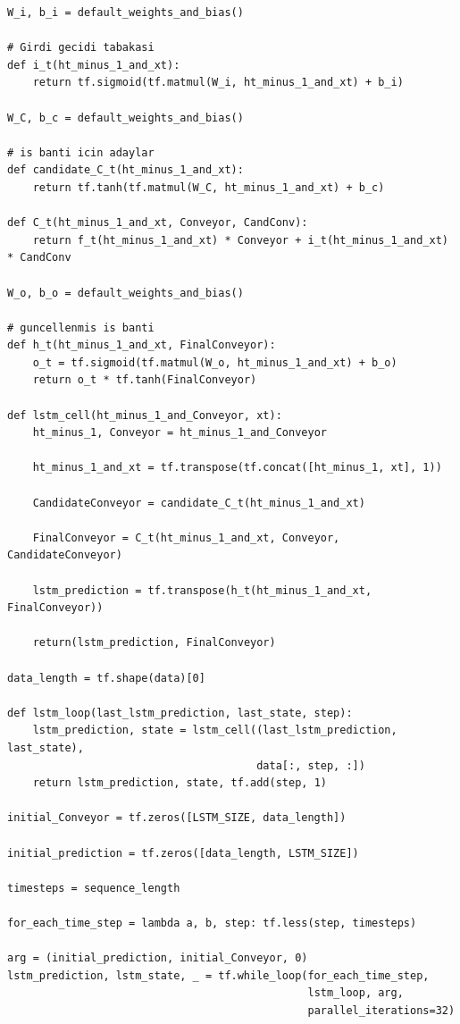 \documentclass[12pt,fleqn]{article}\usepackage{../../common}
\begin{document}
\begin{verbatim}
W_i, b_i = default_weights_and_bias()

# Girdi gecidi tabakasi
def i_t(ht_minus_1_and_xt):
    return tf.sigmoid(tf.matmul(W_i, ht_minus_1_and_xt) + b_i)

W_C, b_c = default_weights_and_bias()

# is banti icin adaylar
def candidate_C_t(ht_minus_1_and_xt):
    return tf.tanh(tf.matmul(W_C, ht_minus_1_and_xt) + b_c)

def C_t(ht_minus_1_and_xt, Conveyor, CandConv):
    return f_t(ht_minus_1_and_xt) * Conveyor + i_t(ht_minus_1_and_xt) * CandConv

W_o, b_o = default_weights_and_bias()

# guncellenmis is banti
def h_t(ht_minus_1_and_xt, FinalConveyor):
    o_t = tf.sigmoid(tf.matmul(W_o, ht_minus_1_and_xt) + b_o)    
    return o_t * tf.tanh(FinalConveyor)

def lstm_cell(ht_minus_1_and_Conveyor, xt):
    ht_minus_1, Conveyor = ht_minus_1_and_Conveyor
    
    ht_minus_1_and_xt = tf.transpose(tf.concat([ht_minus_1, xt], 1))
    
    CandidateConveyor = candidate_C_t(ht_minus_1_and_xt)
    
    FinalConveyor = C_t(ht_minus_1_and_xt, Conveyor, CandidateConveyor)
    
    lstm_prediction = tf.transpose(h_t(ht_minus_1_and_xt, FinalConveyor))
    
    return(lstm_prediction, FinalConveyor)

data_length = tf.shape(data)[0]

def lstm_loop(last_lstm_prediction, last_state, step):
    lstm_prediction, state = lstm_cell((last_lstm_prediction, last_state),
                                       data[:, step, :])
    return lstm_prediction, state, tf.add(step, 1)

initial_Conveyor = tf.zeros([LSTM_SIZE, data_length])

initial_prediction = tf.zeros([data_length, LSTM_SIZE])

timesteps = sequence_length

for_each_time_step = lambda a, b, step: tf.less(step, timesteps)

arg = (initial_prediction, initial_Conveyor, 0)
lstm_prediction, lstm_state, _ = tf.while_loop(for_each_time_step,
                                               lstm_loop, arg,
                                               parallel_iterations=32)


\end{verbatim}
\end{document}
